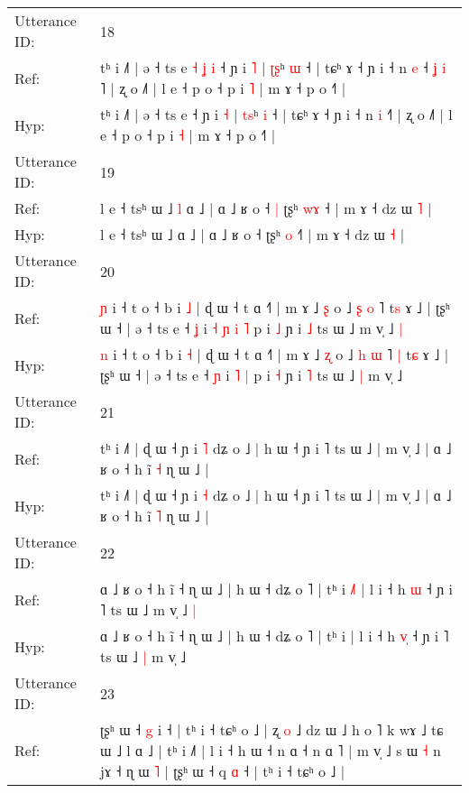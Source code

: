 \documentclass[10pt]{article}
\DeclareRobustCommand{\hl}[1]{{\textcolor{red}{#1}}}
\begin{document}
\begin{longtable}{ll}
\midrule
Utterance ID: & 18 \\
Ref: & tʰ i ˩˥ | ə ˧ ts e\hl{ }\hl{˧}\hl{ }\hl{ʝ}\hl{ }\hl{i} ˧ ɲ i \hl{˥} | \hl{ʈ}\hl{ʂ}ʰ \hl{ɯ} ˧ | tɕʰ ɤ ˧ ɲ i ˧ n \hl{e} ˧\hl{ }\hl{ʝ}\hl{ }\hl{i}\hl{ }˥ | ʐ o ˩˥ | l e ˧ p o ˧ p i \hl{˥} | m ɤ ˧ p o ˧˥ |
 \\
Hyp: & tʰ i ˩˥ | ə ˧ ts e\hl{}\hl{}\hl{}\hl{}\hl{}\hl{} ˧ ɲ i \hl{˧} | \hl{t}\hl{s}ʰ \hl{i} ˧ | tɕʰ ɤ ˧ ɲ i ˧ n \hl{i} ˧\hl{}\hl{}\hl{}\hl{}\hl{}˥ | ʐ o ˩˥ | l e ˧ p o ˧ p i \hl{˧} | m ɤ ˧ p o ˧˥ |
 \\
\midrule
Utterance ID: & 19 \\
Ref: & l e ˧ tsʰ ɯ ˩\hl{ }\hl{l} ɑ ˩ | ɑ ˩ ʁ o ˧\hl{ }\hl{|} ʈʂʰ \hl{w}\hl{ɤ} ˧\hl{} | m ɤ ˧ dz ɯ \hl{˥} |
 \\
Hyp: & l e ˧ tsʰ ɯ ˩\hl{}\hl{} ɑ ˩ | ɑ ˩ ʁ o ˧\hl{}\hl{} ʈʂʰ \hl{}\hl{o} ˧\hl{˥} | m ɤ ˧ dz ɯ \hl{˧} |
 \\
\midrule
Utterance ID: & 20 \\
Ref: & \hl{ɲ} i ˧ t o ˧ b i \hl{˩} | ɖ ɯ ˧ t ɑ ˧˥ | m ɤ ˩ \hl{ʂ} o ˩ \hl{ʂ} \hl{o} ˥\hl{}\hl{} t\hl{s} ɤ ˩ | ʈʂʰ ɯ ˧ | ə ˧ ts e ˧ \hl{ʝ} i\hl{ }\hl{˧}\hl{ }\hl{ɲ} \hl{i} \hl{˥} p i \hl{˩} ɲ i \hl{˩} ts ɯ ˩\hl{}\hl{} m v̩ ˩\hl{ }\hl{|}
 \\
Hyp: & \hl{n} i ˧ t o ˧ b i \hl{˧} | ɖ ɯ ˧ t ɑ ˧˥ | m ɤ ˩ \hl{ʐ} o ˩ \hl{h} \hl{ɯ} ˥\hl{ }\hl{|} t\hl{ɕ} ɤ ˩ | ʈʂʰ ɯ ˧ | ə ˧ ts e ˧ \hl{ɲ} i\hl{}\hl{}\hl{}\hl{} \hl{˥} \hl{|} p i \hl{˧} ɲ i \hl{˥} ts ɯ ˩\hl{ }\hl{|} m v̩ ˩\hl{}\hl{}
 \\
\midrule
Utterance ID: & 21 \\
Ref: & tʰ i ˩˥ | ɖ ɯ ˧ ɲ i \hl{˥} dʑ o ˩ | h ɯ ˧ ɲ i ˥ ts ɯ ˩ | m v̩ ˩ | ɑ ˩ ʁ o ˧ h ĩ \hl{˧} ɳ ɯ ˩ |
 \\
Hyp: & tʰ i ˩˥ | ɖ ɯ ˧ ɲ i \hl{˧} dʑ o ˩ | h ɯ ˧ ɲ i ˥ ts ɯ ˩ | m v̩ ˩ | ɑ ˩ ʁ o ˧ h ĩ \hl{˥} ɳ ɯ ˩ |
 \\
\midrule
Utterance ID: & 22 \\
Ref: & ɑ ˩ ʁ o ˧ h ĩ ˧ ɳ ɯ ˩ | h ɯ ˧ dʑ o ˥ | tʰ i\hl{ }\hl{˩}\hl{˥} | l i ˧ h \hl{}\hl{ɯ} ˧ ɲ i ˥ ts ɯ ˩\hl{}\hl{} m v̩ ˩\hl{ }\hl{|}
 \\
Hyp: & ɑ ˩ ʁ o ˧ h ĩ ˧ ɳ ɯ ˩ | h ɯ ˧ dʑ o ˥ | tʰ i\hl{}\hl{}\hl{} | l i ˧ h \hl{v}\hl{̩} ˧ ɲ i ˥ ts ɯ ˩\hl{ }\hl{|} m v̩ ˩\hl{}\hl{}
 \\
\midrule
Utterance ID: & 23 \\
Ref: & ʈʂʰ ɯ ˧ \hl{g} i ˧ | tʰ i ˧ tɕʰ o ˩ | ʐ \hl{}\hl{o} ˩ dz ɯ ˩ h o ˥ k wɤ ˩ tɕ ɯ ˩ l ɑ ˩ | tʰ i ˩˥ | l i ˧ h ɯ ˧ n ɑ ˧ n ɑ ˥ | m v̩ ˩ s ɯ\hl{ }\hl{˧} n jɤ ˧ ɳ ɯ \hl{˥} | ʈʂʰ ɯ ˧ q\hl{} \hl{}\hl{ɑ} ˧ | tʰ i ˧ tɕʰ o ˩ |

\end{longtable}
\end{document}
